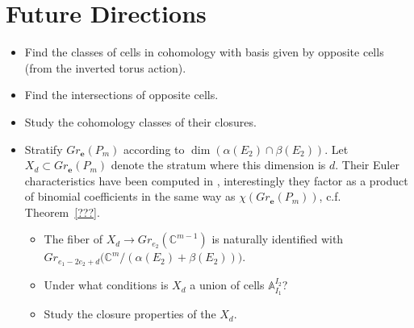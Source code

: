 \documentclass{amsart}
\numberwithin{equation}{section}
\renewcommand{\AA}{\mathbb{A}}
\newcommand{\CC}{\mathbb{C}}
\newcommand{\bfe}{\mathbf{e}}
\begin{document}
\section{Future Directions}
  \begin{itemize}
    \item Find the classes of cells in cohomology with basis given by opposite cells (from the inverted torus action).
    \item Find the intersections of opposite cells.
    \item Study the cohomology classes of their closures.
    \item Stratify $Gr_\bfe(P_m)$ according to $\dim(\alpha(E_2)\cap\beta(E_2))$.  
      Let $X_d\subset Gr_\bfe(P_m)$ denote the stratum where this dimension is $d$.
      Their Euler characteristics have been computed in \cite{cz}, interestingly they factor as a product of binomial coefficients in the same way as $\chi(Gr_\bfe(P_m))$, c.f. Theorem~\ref{???}.
      \begin{itemize}
        \item The fiber of $X_d\to Gr_{e_2}(\CC^{m-1})$ is naturally identified with $Gr_{e_1-2e_2+d}\big(\CC^m/(\alpha(E_2)+\beta(E_2))\big)$.
        \item Under what conditions is $X_d$ a union of cells $\AA_{I_1}^{I_2}$?
        \item Study the closure properties of the $X_d$.
      \end{itemize}
  \end{itemize}
\end{document}

